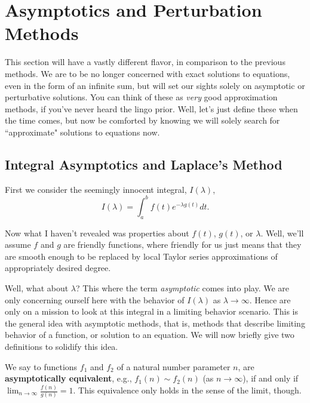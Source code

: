 \graphicspath{{./Asymptotics/}}


%
%
%
%
\section{Asymptotics and Perturbation Methods}

This section will have a vastly different flavor, in comparison to the previous methods. We are to be no longer concerned with exact solutions to equations, even in the form of an infinite sum, but will set our sights solely on asymptotic or perturbative solutions. You can think of these as \emph{very} good approximation methods, if you've never heard the lingo prior. Well, let's just define these when the time comes, but now be comforted by knowing we will solely search for ``approximate" solutions to equations now. 


%
%
%
%
\subsection{Integral Asymptotics and Laplace's Method}

First we consider the seemingly innocent integral, $I(\lambda)$,
\begin{equation}
\label{laplace_integral} I(\lambda) = \int_a^b f(t) e^{-\lambda g(t) } dt.
\end{equation}

Now what I haven't revealed was properties about $f(t)$, $g(t)$, or $\lambda$. Well, we'll assume $f$ and $g$ are friendly functions, where friendly for us just means that they are smooth enough to be replaced by local Taylor series approximations of appropriately desired degree. 

Well, what about $\lambda$? This where the term \emph{asymptotic} comes into play. We are only concerning ourself here with the behavior of $I(\lambda)$ as $\lambda\rightarrow\infty$. Hence are only on a mission to look at this integral in a limiting behavior scenario. This is the general idea with asymptotic methods, that is, methods that describe limiting behavior of a function, or solution to an equation. We will now briefly give two definitions to solidify this idea.  

\begin{definition}
We say to functions $f_1$ and $f_2$ of a natural number parameter $n$, are \textbf{asymptotically equivalent}, e.g., $f_1(n) \sim f_2(n)$ (as $n\rightarrow\infty$), if and only if $\lim_{n\rightarrow\infty} \frac{f(n)}{g(n)}=1$. This equivalence only holds in the sense of the limit, though.
\end{definition}

